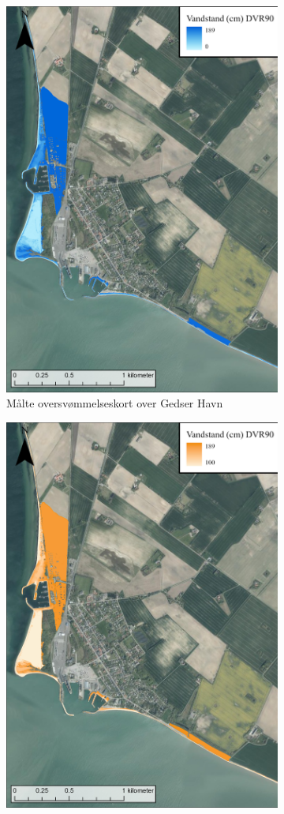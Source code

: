 \begin{figure}[H]
    \begin{subfigure}[t]{0.5\textwidth}
        \centering
        \includegraphics[width=0.8\linewidth]{images/Resultater/2023Malt/2023 resultat_gedser.jpg}
        \caption{Målte oversvømmelseskort over Gedser Havn}
        \label{Subfig: Målt Gedser}
    \end{subfigure}
    \begin{subfigure}[t]{0.5\textwidth}
        \centering
        \includegraphics[width=0.8\linewidth]{images/Resultater/2023Model/2023 model_gedser.jpg}

\end{subfigure}
\end{figure}
